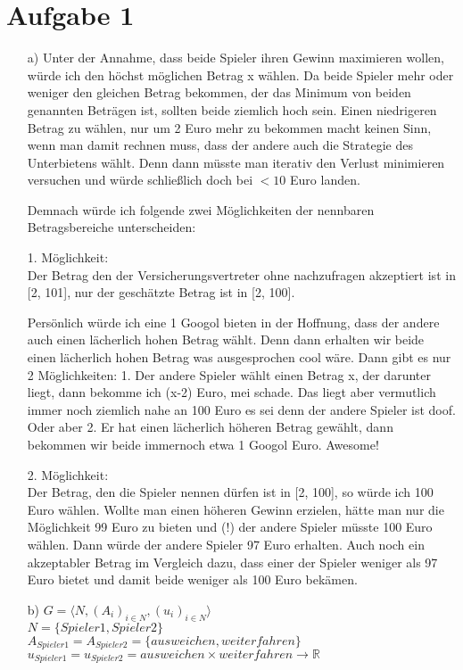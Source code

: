 \documentclass{article}
\begin{document}
\section*{Aufgabe 1}
	\begin{enumerate}
		\item [a)]
		Unter der Annahme, dass beide Spieler ihren Gewinn maximieren wollen, würde
		ich den höchst möglichen Betrag x wählen. Da beide Spieler mehr oder weniger
		den gleichen Betrag bekommen, der das Minimum von beiden genannten Beträgen ist,
		sollten beide ziemlich hoch sein. Einen niedrigeren Betrag zu wählen, nur um
		2 Euro mehr zu bekommen macht keinen Sinn, wenn man damit rechnen muss, dass der
		andere auch die Strategie des Unterbietens wählt. Denn dann müsste man iterativ
		den Verlust minimieren versuchen und würde schließlich doch bei $<10$ Euro landen.
		
		Demnach würde ich folgende zwei Möglichkeiten der nennbaren Betragsbereiche
		unterscheiden:
		
		1. Möglichkeit:\\ 
		Der Betrag den der Versicherungsvertreter ohne nachzufragen akzeptiert ist in [2, 101],
		nur der geschätzte Betrag ist in [2, 100].
		
		Persönlich würde ich eine 1 Googol bieten in der Hoffnung, dass der andere auch
		einen lächerlich hohen Betrag wählt. Denn dann erhalten wir beide einen
		lächerlich hohen Betrag was ausgesprochen cool wäre. Dann gibt es
		nur 2 Möglichkeiten:
		1. Der andere Spieler wählt einen Betrag x, der darunter liegt, dann bekomme ich
		(x-2) Euro, mei schade. Das liegt aber vermutlich immer noch ziemlich nahe an
		100 Euro es sei denn der andere Spieler ist doof. Oder aber
		2. Er hat einen lächerlich höheren Betrag gewählt, dann bekommen wir beide
		immernoch etwa 1 Googol Euro. Awesome!
		
		2. Möglichkeit:\\
		Der Betrag, den die Spieler nennen dürfen ist in [2, 100], so würde ich 100 Euro
		wählen.
		Wollte man einen höheren Gewinn erzielen, hätte man nur
		die Möglichkeit 99 Euro zu bieten und (!) der andere Spieler müsste 100 Euro wählen.
		Dann würde der andere Spieler 97 Euro erhalten. Auch noch ein akzeptabler Betrag im
		Vergleich dazu, dass einer der Spieler weniger als 97 Euro bietet und damit beide
		weniger als 100 Euro bekämen.

		\item [b)]
			$G = \langle N, (A_i)_{i \in N}, (u_i)_{i \in N} \rangle$ \\
			$N = \{ Spieler1, Spieler2 \}$\\
			$A_{Spieler1} = A_{Spieler2} = \{ \mathit{ausweichen}, \mathit{weiterfahren}\}$\\
			$u_{Spieler1} = u_{Spieler2} = ausweichen \times weiterfahren \rightarrow \mathbb{R}$
			

\end{enumerate}
\end{document}
